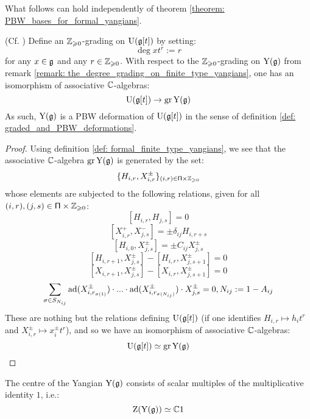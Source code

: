         What follows can hold independently of theorem \ref{theorem: PBW_bases_for_formal_yangians}. 
        \begin{lemma} \label{lemma: finite_type_yangians_as_PBW_deformations}
            (Cf. \cite[Proposition 12.1.6]{chari_pressley_quantum_groups}) Define an $\mathbb{Z}_{\geqslant 0}$-grading on $\mathrm{U}(\mathfrak{g}[t])$ by setting:
                $$\deg x t^r := r$$
            for any $x \in \mathfrak{g}$ and any $r \in \mathbb{Z}_{\geqslant 0}$. With respect to the $\mathbb{Z}_{\geqslant 0}$-grading on $\mathrm{Y}(\mathfrak{g})$ from remark \ref{remark: the_degree_grading_on_finite_type_yangians}, one has an isomorphism of associative $\mathbb{C}$-algebras:
                $$\mathrm{U}( \mathfrak{g}[t] ) \to \operatorname{gr} \mathrm{Y}(\mathfrak{g})$$
            As such, $\mathrm{Y}(\mathfrak{g})$ is a PBW deformation of $\mathrm{U}(\mathfrak{g}[t])$ in the sense of definition \ref{def: graded_and_PBW_deformations}.
        \end{lemma}
            \begin{proof}
                Using definition \ref{def: formal_finite_type_yangians}, we see that the associative $\mathbb{C}$-algebra $\operatorname{gr} \mathrm{Y}(\mathfrak{g})$ is generated by the set:
                    $$\{ H_{i, r}, X_{i, r}^{\pm} \}_{(i ,r) \in \simpleroots \x \Z_{\geq 0}}$$
                whose elements are subjected to the following relations, given for all $(i, r), (j, s) \in \simpleroots \x \Z_{\geq 0}$:
                    $$[ H_{i, r}, H_{j, s} ] = 0$$
                    $$[ X_{i, r}^+, X_{j, s}^- ] = \pm \delta_{ij} H_{i, r + s}$$
                    $$[ H_{i, 0}, X_{j, s}^{\pm} ] = \pm C_{ij} X_{j, s}^{\pm}$$
                    $$[ H_{i, r + 1}, X_{j, s}^{\pm} ] - [ H_{i, r}, X_{j, s + 1}^{\pm} ] = 0$$
                    $$[ X_{i, r + 1}, X_{j, s}^{\pm} ] - [ X_{i, r}, X_{j, s + 1}^{\pm} ] = 0$$
                    $$\sum_{\sigma \in S_{N_{ij}}} \mathrm{ad}(X_{i, r_{\sigma(1)}}^{\pm}) \cdot ... \cdot \mathrm{ad}(X_{i, r_{\sigma(N_{ij})}}^{\pm}) \cdot X_{j, s}^{\pm} = 0, N_{ij} := 1 - A_{ij}$$
                These are nothing but the relations defining $\mathrm{U}( \mathfrak{g}[t] )$ (if one identifies $H_{i, r} \mapsto h_i t^r$ and $X_{i, r}^{\pm} \mapsto x_i^{\pm} t^r$), and so we have an isomorphism of associative $\mathbb{C}$-algebras:
                    $$\mathrm{U}( \mathfrak{g}[t] ) \simeq \operatorname{gr} \mathrm{Y}(\mathfrak{g})$$ 
            \end{proof}
        \begin{corollary} \label{coro: centres_of_finite_type_yangians}
            The centre of the Yangian $\mathrm{Y}(\mathfrak{g})$ consists of scalar multiples of the multiplicative identity $1$, i.e.:
                $$\mathrm{Z}( \mathrm{Y}(\mathfrak{g}) ) \simeq \mathbb{C} 1$$
        \end{corollary}
